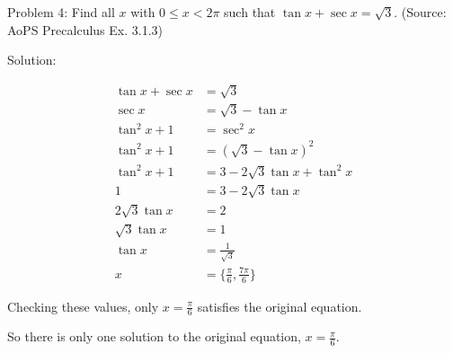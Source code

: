 Problem 4: Find all $x$ with $0\le x < 2\pi$ such that $\tan x + \sec x = \!\sqrt{3}$. (Source: AoPS Precalculus Ex. 3.1.3)

Solution:

\begin{align*}
\tan x + \sec x &= \sqrt 3 \\
\sec x &= \sqrt 3 - \tan x \\
\tan^2 x + 1 &= \sec^2 x \\
\tan^2 x + 1 &= (\sqrt 3 - \tan x)^2 \\
\tan^2 x + 1 &= 3 - 2\sqrt 3 \tan x + \tan^2 x \\
1 &= 3 - 2\sqrt 3 \tan x \\
2\sqrt 3 \tan x &= 2 \\
\sqrt 3 \tan x &= 1 \\
\tan x &= \frac{1}{\sqrt 3} \\
x &= \Bigg\{ \frac{\pi}{6}, \frac{7\pi}{6} \Bigg\}
\end{align*}

Checking these values, only $x = \frac{\pi}{6}$ satisfies the original equation.

So there is only one solution to the original equation, $\boxed{x = \frac{\pi}{6}}$.
